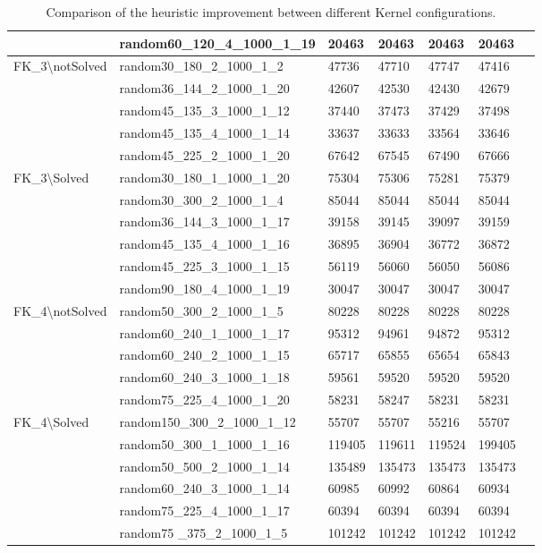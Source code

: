 \begin{table}[!htbp]
{\begin{tabular}{@{}lllllll@{}}
            & random60\_120\_4\_1000\_1\_19 &20463  &20463  &20463 &20463\\
            \midrule
            \multirow{5}{*}{FK\_3\textbackslash notSolved} 
            & random30\_180\_2\_1000\_1\_2 &47736  &47710  &47747  &47416\\  
            & random36\_144\_2\_1000\_1\_20 &42607  &42530  &42430  &42679\\  
            & random45\_135\_3\_1000\_1\_12 &37440  &37473  &37429  &37498\\  
            & random45\_135\_4\_1000\_1\_14 &33637  &33633  &33564  &33646\\  
            & random45\_225\_2\_1000\_1\_20 &67642 &67545  &67490 &67666\\ 
            \midrule
            \multirow{6}{*}{FK\_3\textbackslash Solved}
            & random30\_180\_1\_1000\_1\_20 &75304 &75306  &75281  &75379\\  
            & random30\_300\_2\_1000\_1\_4 &85044 &85044  &85044  &85044\\  
            & random36\_144\_3\_1000\_1\_17 &39158 &39145  &39097  &39159\\  
            & random45\_135\_4\_1000\_1\_16 &36895 &36904  &36772  &36872\\  
            & random45\_225\_3\_1000\_1\_15 &56119 &56060  &56050  &56086\\  
            & random90\_180\_4\_1000\_1\_19 &30047 &30047  &30047 &30047\\  
            \midrule
            \multirow{5}{*}{FK\_4\textbackslash notSolved}
            & random50\_300\_2\_1000\_1\_5 &80228 &80228  &80228  &80228\\  
            & random60\_240\_1\_1000\_1\_17 &95312 &94961  &94872  &95312\\  
            & random60\_240\_2\_1000\_1\_15 &65717 &65855  &65654  &65843\\  
            & random60\_240\_3\_1000\_1\_18 &59561 &59520  &59520  &59520\\  
            & random75\_225\_4\_1000\_1\_20 &58231 &58247  &58231 &58231\\ 
            \midrule
            \multirow{6}{*}{FK\_4\textbackslash Solved}
            & random150\_300\_2\_1000\_1\_12 &55707 &55707  &55216  &55707\\  
            & random50\_300\_1\_1000\_1\_16 &119405  &119611  &119524  &199405\\  
            & random50\_500\_2\_1000\_1\_14 &135489  &135473  &135473  &135473\\  
            & random60\_240\_3\_1000\_1\_14  &60985  &60992  &60864 &60934\\  
            & random75\_225\_4\_1000\_1\_17 &60394  &60394  &60394 &60394\\  
            & random75 \_375\_2\_1000\_1\_5 &101242  &101242 &101242 &101242\\ 
            \bottomrule
        \end{tabular}
        }
    \caption{Comparison of the heuristic improvement between different Kernel configurations.}
    \label{tab:comp_heu}
\end{table}
